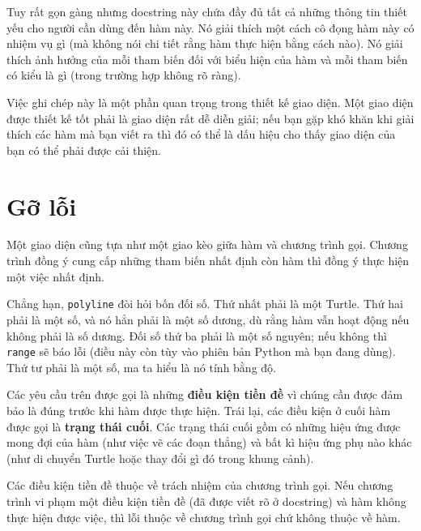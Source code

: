 \documentclass[11pt]{book}
\begin{document}

Tuy rất gọn gàng nhưng docstring này chứa đầy đủ tất cả những
thông tin thiết yếu cho người cần dùng đến hàm này. Nó giải thích
một cách cô đọng hàm này có nhiệm vụ gì (mà không nói chi tiết 
rằng hàm thực hiện bằng cách nào). Nó giải thích ảnh hưởng của
mỗi tham biến đối với biểu hiện của hàm và mỗi tham biến có kiểu
là gì (trong trường hợp không rõ ràng).

Việc ghi chép này là một phần quan trọng trong thiết kế giao diện.
Một giao diện được thiết kế tốt phải là giao diện rất dễ diễn giải;
nếu bạn gặp khó khăn khi giải thích các hàm mà bạn viết ra thì đó
có thể là dấu hiệu cho thấy giao diện của bạn có thể phải được
cải thiện.


\section{Gỡ lỗi}

Một giao diện cũng tựa như một giao kèo giữa hàm và chương trình
gọi. Chương trình đồng ý cung cấp những tham biến nhất định
còn hàm thì đồng ý thực hiện một việc nhất định.

Chẳng hạn, {\tt polyline} đòi hỏi bốn đối số. Thứ nhất phải là
một Turtle. Thứ hai phải là một số, và nó hẳn phải là một số dương,
dù rằng hàm vẫn hoạt động nếu không phải là số dương. Đối số thứ ba 
phải là một số nguyên; nếu không thì {\tt range} sẽ báo lỗi 
(điều này còn tùy vào phiên bản Python mà bạn đang dùng). 
Thứ tư phải là một số, ma ta hiểu là nó tính bằng độ.

Các yêu cầu trên được gọi là những {\bf điều kiện tiền đề} vì chúng
cần được đảm bảo là đúng trước khi hàm được thực hiện. Trái lại,
các điều kiện ở cuối hàm được gọi là {\bf trạng thái cuối}. Các
trạng thái cuối gồm có những hiệu ứng được mong đợi của hàm
(như việc vẽ các đoạn thẳng) và bất kì hiệu ứng phụ nào khác
(như di chuyển Turtle hoặc thay đổi gì đó trong khung cảnh).


Các điều kiện tiền đề thuộc về trách nhiệm của chương trình gọi. 
Nếu chương trình vi phạm một điều kiện tiền đề (đã được viết rõ
ở docstring) và hàm không thực hiện được việc, thì lỗi thuộc về
chương trình gọi chứ không thuộc về hàm.

\end{document}
